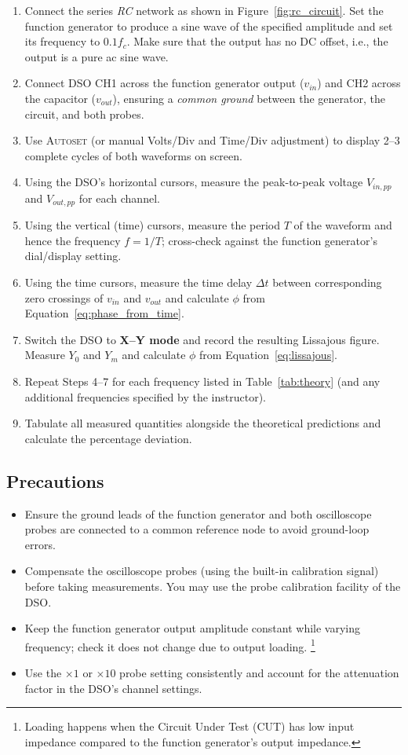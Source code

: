 \begin{enumerate}[label=\arabic*.]
	\item Connect the series \emph{RC} network as shown in Figure~\ref{fig:rc_circuit}. Set the function generator to produce a sine wave of the specified amplitude and set its frequency to $0.1 f_c$. Make sure that the output has no DC offset, i.e., the output is a pure ac sine wave. 
	\item Connect DSO CH1 across the function generator output ($v_{in}$) and CH2 across the capacitor ($v_{out}$), ensuring a \emph{common ground} between the generator, the circuit, and both probes.
	\item Use \textsc{Autoset} (or manual Volts/Div and Time/Div adjustment) to display 2--3 complete cycles of both waveforms on screen.
	\item Using the DSO's horizontal cursors, measure the peak-to-peak voltage $V_{in,pp}$ and $V_{out,pp}$ for each channel.
	\item Using the vertical (time) cursors, measure the period $T$ of the waveform and hence the frequency $f = 1/T$; cross-check against the function generator's dial/display setting.
	\item Using the time cursors, measure the time delay $\Delta t$ between corresponding zero crossings of $v_{in}$ and $v_{out}$ and calculate $\phi$ from Equation~\eqref{eq:phase_from_time}.
	\item Switch the DSO to \textbf{X--Y mode} and record the resulting Lissajous figure. Measure $Y_0$ and $Y_m$ and calculate $\phi$ from Equation~\eqref{eq:lissajous}.
	\item Repeat Steps 4--7 for each frequency listed in Table~\ref{tab:theory} (and any additional frequencies specified by the instructor).
	\item Tabulate all measured quantities alongside the theoretical predictions and calculate the percentage deviation.
\end{enumerate}

\subsection*{Precautions}
\begin{itemize}
	\item Ensure the ground leads of the function generator and both oscilloscope probes are connected to a common reference node to avoid ground-loop errors.
	\item Compensate the oscilloscope probes (using the built-in calibration signal) before taking measurements. You may use the probe calibration facility of the DSO.
	\item Keep the function generator output amplitude constant while varying frequency; check it does not change due to output loading. \footnote{Loading happens when the Circuit Under Test (CUT) has low input impedance compared to the function generator's output impedance.} 
	\item Use the $\times 1$ or $\times 10$ probe setting consistently and account for the attenuation factor in the DSO's channel settings.
\end{itemize}
